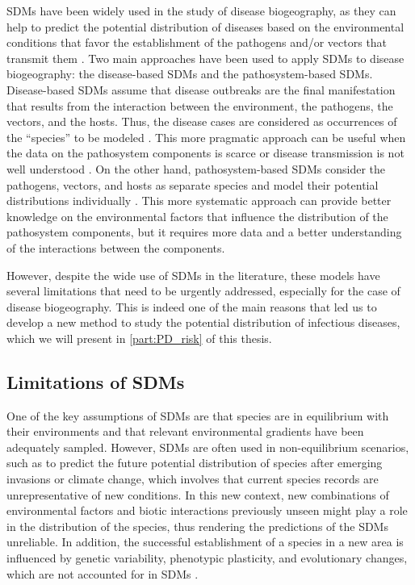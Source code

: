 SDMs have been widely used in the study of disease biogeography, as they can
help to predict the potential distribution of diseases based on the
environmental conditions that favor the establishment of the pathogens and/or
vectors that transmit them \cite{Pigott2014,Barro2016,Alimi2015}. Two main
approaches have been used to apply SDMs to disease biogeography: the
disease-based SDMs and the pathosystem-based SDMs. Disease-based SDMs assume
that disease outbreaks are the final manifestation that results from the
interaction between the environment, the pathogens, the vectors, and the
hosts. Thus, the disease cases are considered as occurrences of the ``species''
to be modeled \cite{Pigott2015,Quiner2017}. This more pragmatic approach can be
useful when the data on the pathosystem components is scarce or disease
transmission is not well understood \cite{Johnson2019}. On the other hand,
pathosystem-based SDMs consider the pathogens, vectors, and hosts as separate
species and model their potential distributions individually
\cite{Samy2014,Baak2017}. This more systematic approach can provide better
knowledge on the environmental factors that influence the distribution of the
pathosystem components, but it requires more data and a better understanding
of the interactions between the components.

However, despite the wide use of SDMs in the literature, these models have
several limitations that need to be urgently addressed, especially for the
case of disease biogeography. This is indeed one of the main reasons that led
us to develop a new method to study the potential distribution of infectious
diseases, which we will present in \cref{part:PD_risk} of this thesis.

\subsection{\label{sec:Limitations of SDMs} Limitations of SDMs}

One of the key assumptions of SDMs are that species are in equilibrium with
their environments and that relevant environmental gradients have been
adequately sampled. However, SDMs are often used in non-equilibrium
scenarios, such as to predict the future potential distribution of species
after
emerging invasions or climate change, which involves that current species
records are unrepresentative of new conditions. In this new context, new
combinations of environmental factors and biotic interactions previously unseen
might play a role in the distribution of the species, thus rendering the
predictions of the SDMs unreliable. In addition, the successful establishment
of a species in a new area is influenced by genetic variability, phenotypic
plasticity, and evolutionary changes, which are not accounted for in SDMs
\cite{Elith2009}.

